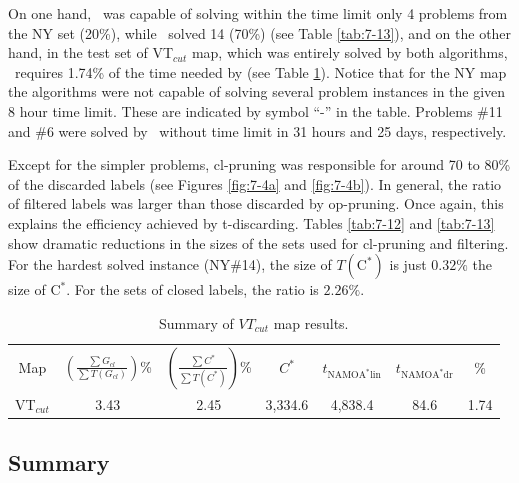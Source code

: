 On one hand, \namoalin \ was capable of solving within the time limit only 4 problems from the NY set (20\%), while \namoate \ solved 14 (70\%) (see Table \ref{tab:7-13}), and on the other hand, in the test set of VT$_{cut}$ map, which was entirely solved by both algorithms, \namoate \ requires 1.74\% of the time needed by \namoalin (see Table \ref{tab:7-14}). Notice that for the NY map the algorithms were not capable of solving several problem instances in the given 8 hour time limit. These are indicated by symbol ``-'' in the table. Problems \#11 and \#6 were solved by \namoalin \ without time limit in 31 hours and 25 days, respectively.

Except for the simpler problems, cl-pruning was responsible for around 70 to 80\% of the discarded labels (see Figures \ref{fig:7-4a} and \ref{fig:7-4b}). In general, the ratio of filtered labels was larger than those discarded by op-pruning. Once again, this explains the efficiency achieved by t-discarding. Tables \ref{tab:7-12} and \ref{tab:7-13} show dramatic reductions in the sizes of the sets used for cl-pruning and filtering. For the hardest solved instance (NY\#14), the size of $T(\text{C}^*)$ is just $0.32\%$ the size of $\text{C}^*$. For the sets of closed labels, the ratio is $2.26\%$.

\begin{table}
\caption{Summary of $VT_{cut}$ map results.}
\label{tab:7-14}
\begin{center}
\begin{tabular}{ccccccc}
\hline \noalign{\smallskip}
Map & $(\frac{\sum G_{cl}}{\sum T(G_{cl})})$\% & $(\frac{\sum C^*}{\sum T(C^*)})$\% & $C^*$ & $t_{\text{NAMOA}^* \text{lin}}$ & $t_{\text{NAMOA}^* \text{dr}}$ & \% \\
\noalign{\smallskip} \hline 
VT$_{cut}$ & 3.43 & 2.45 & 3,334.6 & 4,838.4 & 84.6 & 1.74 \\
\hline
\end{tabular} 
\end{center}
\end{table}

\subsection{Summary}
\label{chapEmpiricalAnalysis:subsec:summarydimacsnamoate}

